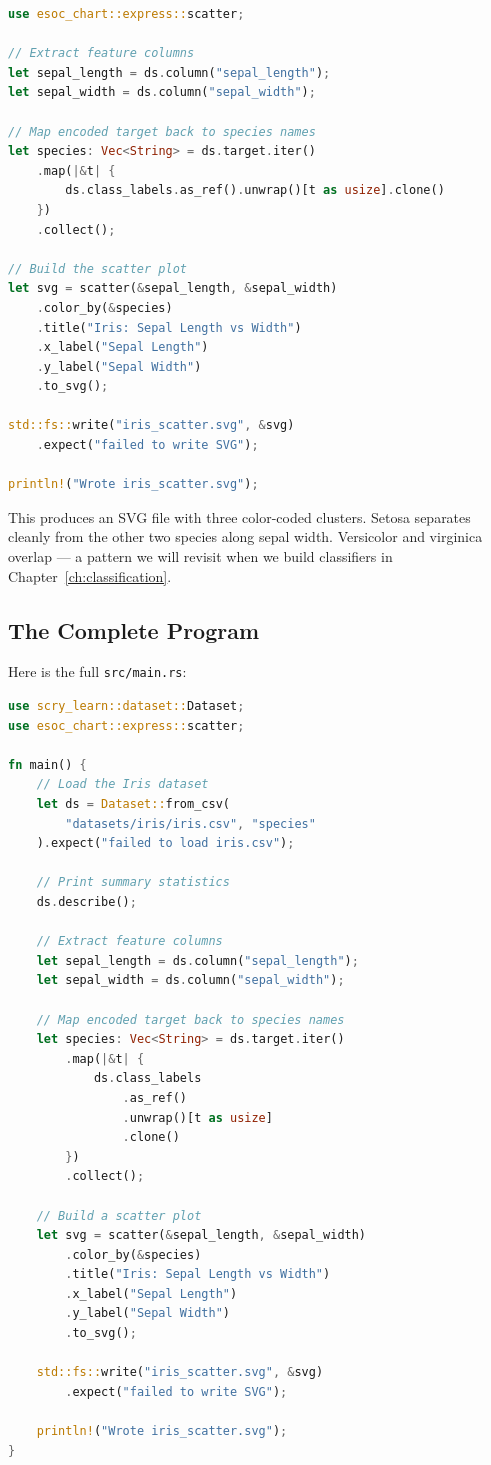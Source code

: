 \begin{lstlisting}[language=rust]
use esoc_chart::express::scatter;

// Extract feature columns
let sepal_length = ds.column("sepal_length");
let sepal_width = ds.column("sepal_width");

// Map encoded target back to species names
let species: Vec<String> = ds.target.iter()
    .map(|&t| {
        ds.class_labels.as_ref().unwrap()[t as usize].clone()
    })
    .collect();

// Build the scatter plot
let svg = scatter(&sepal_length, &sepal_width)
    .color_by(&species)
    .title("Iris: Sepal Length vs Width")
    .x_label("Sepal Length")
    .y_label("Sepal Width")
    .to_svg();

std::fs::write("iris_scatter.svg", &svg)
    .expect("failed to write SVG");

println!("Wrote iris_scatter.svg");
\end{lstlisting}

This produces an SVG file with three color-coded clusters. Setosa separates
cleanly from the other two species along sepal width. Versicolor and virginica
overlap --- a pattern we will revisit when we build classifiers in
Chapter~\ref{ch:classification}.

\subsection{The Complete Program}

Here is the full \texttt{src/main.rs}:

\begin{lstlisting}[language=rust, caption={src/main.rs --- Hello Data Science}]
use scry_learn::dataset::Dataset;
use esoc_chart::express::scatter;

fn main() {
    // Load the Iris dataset
    let ds = Dataset::from_csv(
        "datasets/iris/iris.csv", "species"
    ).expect("failed to load iris.csv");

    // Print summary statistics
    ds.describe();

    // Extract feature columns
    let sepal_length = ds.column("sepal_length");
    let sepal_width = ds.column("sepal_width");

    // Map encoded target back to species names
    let species: Vec<String> = ds.target.iter()
        .map(|&t| {
            ds.class_labels
                .as_ref()
                .unwrap()[t as usize]
                .clone()
        })
        .collect();

    // Build a scatter plot
    let svg = scatter(&sepal_length, &sepal_width)
        .color_by(&species)
        .title("Iris: Sepal Length vs Width")
        .x_label("Sepal Length")
        .y_label("Sepal Width")
        .to_svg();

    std::fs::write("iris_scatter.svg", &svg)
        .expect("failed to write SVG");

    println!("Wrote iris_scatter.svg");
}
\end{lstlisting}

